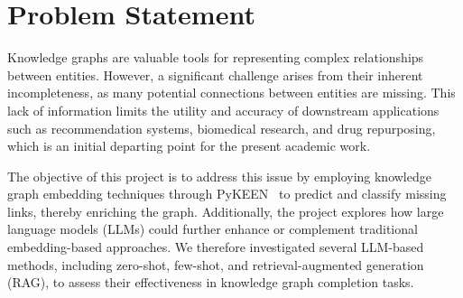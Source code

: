 \section*{Problem Statement}


Knowledge graphs are valuable tools for representing complex relationships between entities.
However, a significant challenge arises from their inherent incompleteness, as many potential connections between entities are missing.
This lack of information limits the utility and accuracy of downstream applications such as recommendation systems, biomedical research, and drug repurposing, which is an initial departing point for the present academic work.

The objective of this project is to address this issue by employing knowledge graph embedding techniques through PyKEEN~\cite{pykeen} to predict and classify missing links, thereby enriching the graph.
Additionally, the project explores how large language models (LLMs) could further enhance or complement traditional embedding-based approaches.
We therefore investigated several LLM-based methods, including zero-shot, few-shot, and retrieval-augmented generation (RAG), to assess their effectiveness in knowledge graph completion tasks.